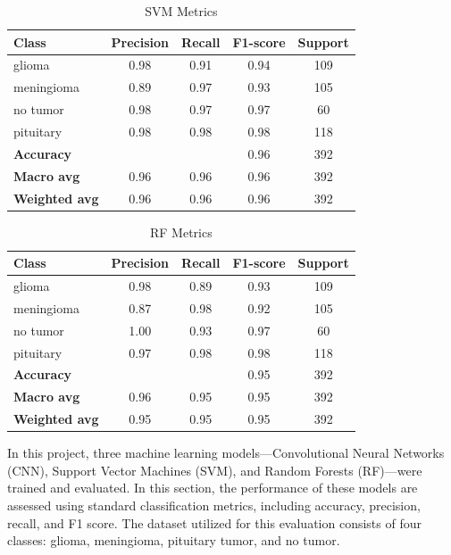 \documentclass[conference]{IEEEtran}
\begin{document}
\begin{table}[h!]
\centering
\caption{SVM Metrics}
\begin{tabular}{lcccc}
\toprule
\textbf{Class} & \textbf{Precision} & \textbf{Recall} & \textbf{F1-score} & \textbf{Support} \\
\midrule
glioma     & 0.98 & 0.91 & 0.94 & 109 \\
meningioma & 0.89 & 0.97 & 0.93 & 105 \\
no tumor   & 0.98 & 0.97 & 0.97 & 60  \\
pituitary  & 0.98 & 0.98 & 0.98 & 118 \\
\midrule
\textbf{Accuracy}    &      &      & 0.96 & 392 \\
\textbf{Macro avg}   & 0.96 & 0.96 & 0.96 & 392 \\
\textbf{Weighted avg}& 0.96 & 0.96 & 0.96 & 392 \\
\bottomrule
\end{tabular}
\end{table}

\begin{table}[h!]
\centering
\caption{RF Metrics}
\begin{tabular}{lcccc}
\toprule
\textbf{Class} & \textbf{Precision} & \textbf{Recall} & \textbf{F1-score} & \textbf{Support} \\
\midrule
glioma     & 0.98 & 0.89 & 0.93 & 109 \\
meningioma & 0.87 & 0.98 & 0.92 & 105 \\
no tumor   & 1.00 & 0.93 & 0.97 & 60  \\
pituitary  & 0.97 & 0.98 & 0.98 & 118 \\
\midrule
\textbf{Accuracy}    &      &      & 0.95 & 392 \\
\textbf{Macro avg}   & 0.96 & 0.95 & 0.95 & 392 \\
\textbf{Weighted avg}& 0.95 & 0.95 & 0.95 & 392 \\
\bottomrule
\end{tabular}
\end{table}

In this project, three machine learning models—Convolutional Neural Networks (CNN), Support Vector Machines (SVM), and Random Forests (RF)—were trained and evaluated. In this section, the performance of these models are assessed using standard classification metrics, including accuracy, precision, recall, and F1 score. The dataset utilized for this evaluation consists of four classes: glioma, meningioma, pituitary tumor, and no tumor.
\end{document}
